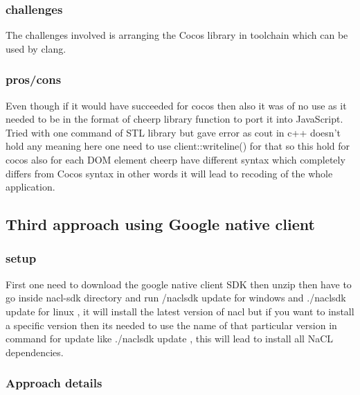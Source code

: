 \documentclass[23pt]{article}
\begin{document}
\subsubsection{challenges}

{\Large The challenges involved is arranging the Cocos library in toolchain which can be used by clang.}

\subsubsection{pros/cons}

{\Large Even though if it would have succeeded for cocos then also it was of no use as it needed to be in the format of cheerp library function to port it into JavaScript. Tried with one command of STL library but gave error as cout in c++ doesn’t hold any meaning here one need to use client::writeline() for that so this hold for cocos also for each DOM element cheerp have different syntax which completely differs from Cocos syntax in other words it will lead to recoding of the whole application. \par}

\subsection{Third approach using Google native client}

\subsubsection{setup}

{\Large First one need to download the google native client SDK then unzip  then have to go inside nacl-sdk directory and run /naclsdk update for windows and ./naclsdk update for linux , it will install the latest version 
of nacl but if you want to install a specific version then its needed to use the name of that particular version in command for update like ./naclsdk update  , this will lead to install all NaCL dependencies.\par}

\subsubsection{Approach details}
\end{document}
